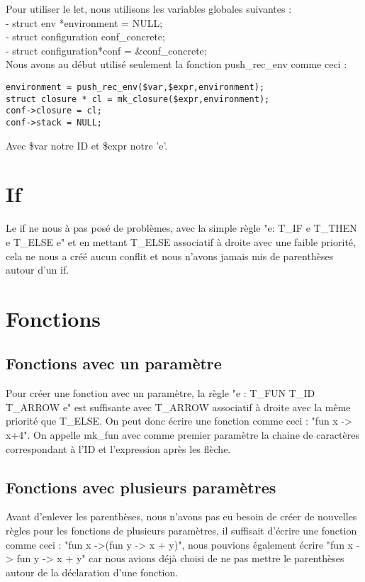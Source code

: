 \documentclass{report}
\begin{document}
Pour utiliser le let, nous utilisons les variables globales suivantes :\\
- struct env *environment = NULL;\\
- struct configuration conf\_concrete;\\
- struct configuration*conf = \&conf\_concrete;\\
Nous avons au début utilisé seulement la fonction push\_rec\_env comme ceci :
\begin{verbatim}
environment = push_rec_env($var,$expr,environment);
struct closure * cl = mk_closure($expr,environment);
conf->closure = cl;
conf->stack = NULL;
\end{verbatim}
Avec \$var notre ID et \$expr notre 'e'.


\section{If}

Le if ne nous à pas posé de problèmes, avec la simple règle "e: T\_IF e T\_THEN e T\_ELSE e" et en mettant T\_ELSE associatif à droite avec une faible priorité, cela ne nous a créé aucun conflit et nous n'avons jamais mis de parenthèses autour d'un if.

\section{Fonctions}
\subsection{Fonctions avec un paramètre}

Pour créer une fonction avec un paramètre, la règle "e : T\_FUN T\_ID T\_ARROW e" est suffisante avec T\_ARROW associatif à droite avec la même priorité que T\_ELSE. On peut donc écrire une fonction comme ceci : "fun x -> x+4".
On appelle mk\_fun avec comme premier paramètre la chaine de caractères correspondant à l'ID et l'expression après les flèche.

\subsection{Fonctions avec plusieurs paramètres}

Avant d'enlever les parenthèses, nous n'avons pas eu besoin de créer de nouvelles règles pour les fonctions de plusieurs paramètres, il suffisait d'écrire une fonction comme ceci : "fun x ->(fun y -> x + y)", nous pouvions également écrire "fun x -> fun y -> x + y" car nous avions déjà choisi de ne pas mettre le parenthèses autour de la déclaration d'une fonction.
\end{document}
